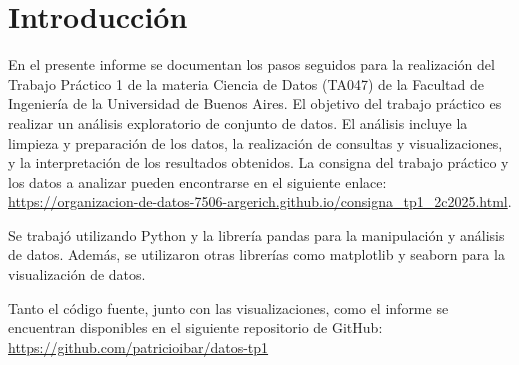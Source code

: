 \section{Introducción}
En el presente informe se documentan los pasos seguidos para la realización del Trabajo Práctico 1 de la materia Ciencia de Datos (TA047) de la Facultad de Ingeniería de la Universidad de Buenos Aires. El objetivo del trabajo práctico es realizar un análisis exploratorio de conjunto de datos. El análisis incluye la limpieza y preparación de los datos, la realización de consultas y visualizaciones, y la interpretación de los resultados obtenidos. La consigna del trabajo práctico y los datos a analizar pueden encontrarse en el siguiente enlace: \url{https://organizacion-de-datos-7506-argerich.github.io/consigna_tp1_2c2025.html}.

Se trabajó utilizando Python y la librería pandas para la manipulación y análisis de datos. Además, se utilizaron otras librerías como matplotlib y seaborn para la visualización de datos.

Tanto el código fuente, junto con las visualizaciones, como el informe se encuentran disponibles en el siguiente repositorio de GitHub: \url{https://github.com/patricioibar/datos-tp1}